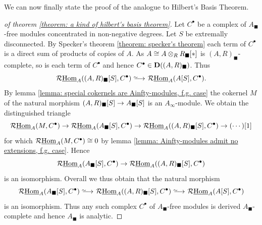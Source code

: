 We can now finally state the proof of the analogue to Hilbert's Basis Theorem.
\begin{proof}[of theorem \ref{theorem: a kind of hilbert's basis theorem}]
	Let $C^\bullet$ be a complex of $A_\blacksquare$-free modules concentrated in non-negative degrees. Let $S$ be extremally disconnected. By Specker's theorem \ref{theorem: specker's theorem} each term of $C^\bullet$ is a direct sum of products of copies of $A$. As $A\cong A\otimes_R {R_\blacksquare[\ast]}$ is $(A, R)_\blacksquare$-complete, so is each term of $C^\bullet$ and hence $C^\bullet\in{{\mathbf{D}}((A,R)_\blacksquare)}$. Thus
		$$\eRHom_A(\free{(A, R)_\blacksquare}{S}, C^\bullet) \isorightarrow \eRHom_A(\free A S, C^\bullet).$$
	By lemma \ref{lemma: special cokernels are Ainfty-modules, f.g. case} the cokernel $M$ of the natural morphism ${(A,R)_\blacksquare[S]}\to{A_\blacksquare[S]}$ is an $A_\infty$-module. We obtain the distinguished triangle
		$$\mathcal{R}{\underline{\operatorname{Hom}}}_A(M, C^\bullet)\to\mathcal{R}{\underline{\operatorname{Hom}}}_A({A_\blacksquare[S]}, C^\bullet)\to\mathcal{R}{\underline{\operatorname{Hom}}}_A({(A, R)_\blacksquare[S]}, C^\bullet)\to (\cdots)[1]$$
	for which $\mathcal{R}{\underline{\operatorname{Hom}}}_A(M, C^\bullet) \cong 0$ by lemma \ref{lemma: Ainfty-modules admit no extensions, f.g. case}. Hence
		$$\mathcal{R}{\underline{\operatorname{Hom}}}_A({A_\blacksquare[S]}, C^\bullet)\to\mathcal{R}{\underline{\operatorname{Hom}}}_A({(A, R)_\blacksquare[S]}, C^\bullet)$$
	is an isomorphism. Overall we thus obtain that the natural morphism
	$$\eRHom_A(\free{A_\blacksquare}{S}, C^\bullet)\isorightarrow \eRHom_A(\free{(A, R)_\blacksquare}{S}, C^\bullet) \isorightarrow \eRHom_A(\free A S, C^\bullet)$$
	is an isomorphism. Thus any such complex $C^\bullet$ of $A_\blacksquare$-free modules is derived $A_\blacksquare$-complete and hence $A_\blacksquare$ is analytic.
\end{proof}
